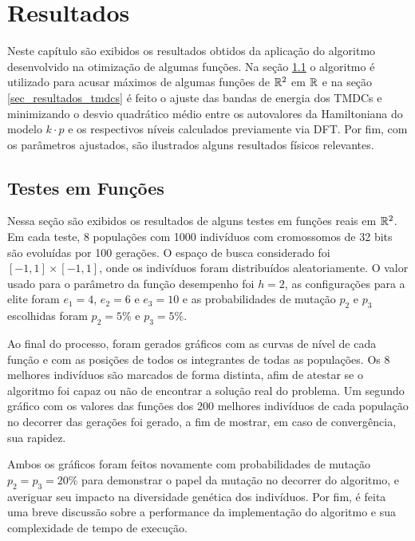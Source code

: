 \chapter{Resultados}
\label{cap_resultados}

Neste capítulo são exibidos os resultados obtidos da aplicação do algoritmo
desenvolvido na otimização de algumas funções. Na seção \ref{sec_test_functions}
o algoritmo é utilizado para acusar máximos de algumas funções de $\mathbb{R}^2$ em $\mathbb{R}$
e na seção \ref{sec_resultados_tmdcs} é feito o ajuste das bandas de energia
dos TMDCs  e  minimizando o desvio quadrático médio entre
os autovalores da Hamiltoniana do modelo $ k \cdot p $ e os respectivos níveis
calculados previamente via DFT. Por fim, com os parâmetros ajustados, são ilustrados
alguns resultados físicos relevantes.

\section{Testes em Funções}
\label{sec_test_functions}

Nessa seção são exibidos os resultados de alguns testes em funções reais em $\mathbb{R}^2$. Em cada teste, 
8 populações com 1000 indivíduos com cromossomos de 32 bits são evoluídas por 100 gerações. O espaço de busca
considerado foi $ [-1,1] \times [-1, 1] $, onde os indivíduos foram distribuídos aleatoriamente. 
O valor usado para o parâmetro da função desempenho foi $h = 2$,
as configurações para a elite foram $e_1 = 4$, $e_2 = 6$ e $e_3 = 10$ e as probabilidades de mutação $p_2$ e $p_3$ escolhidas
foram $p_2 = 5\%$ e $p_3 = 5\%$.

Ao final do processo,
foram gerados gráficos com as curvas de nível de cada função e com as posições de todos os
integrantes de todas as populações. Os 8 melhores indivíduos são marcados de forma distinta,
afim de atestar se o algoritmo foi capaz ou não de encontrar a solução real do problema.
Um segundo gráfico com os valores das funções dos 200 melhores indivíduos de cada população
no decorrer das gerações foi gerado, a fim de mostrar, em caso de convergência, sua rapidez.

Ambos os gráficos foram feitos novamente com probabilidades de mutação $p_2 = p_3 = 20\%$
para demonstrar o papel da mutação no decorrer do algoritmo, e averiguar seu impacto na diversidade genética
dos indivíduos.
Por fim, é feita uma breve discussão sobre a performance da implementação do algoritmo e sua
complexidade de tempo de execução.


